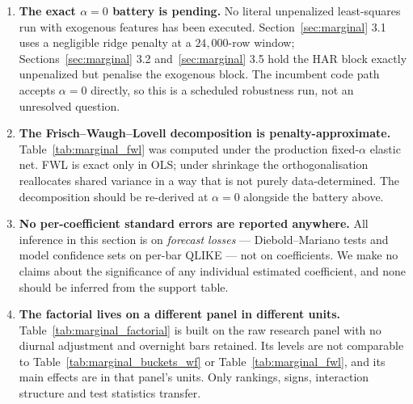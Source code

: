\begin{enumerate}
\item \textbf{The exact $\alpha = 0$ battery is pending.} No literal unpenalized
least-squares run with exogenous features has been executed. Section~\ref{sec:marginal} 3.1
uses a negligible ridge penalty at a $24{,}000$-row window; Sections~\ref{sec:marginal} 3.2
and~\ref{sec:marginal} 3.5 hold the HAR block exactly unpenalized but penalise the
exogenous block. The incumbent code path accepts $\alpha = 0$ directly, so this is a
scheduled robustness run, not an unresolved question.
\item \textbf{The Frisch--Waugh--Lovell decomposition is penalty-approximate.}
Table~\ref{tab:marginal_fwl} was computed under the production fixed-$\alpha$ elastic net.
FWL is exact only in OLS; under shrinkage the orthogonalisation reallocates shared variance
in a way that is not purely data-determined. The decomposition should be re-derived at
$\alpha = 0$ alongside the battery above.
\item \textbf{No per-coefficient standard errors are reported anywhere.} All inference in
this section is on \emph{forecast losses} --- Diebold--Mariano tests and model confidence
sets on per-bar QLIKE --- not on coefficients. We make no claims about the significance of
any individual estimated coefficient, and none should be inferred from the support table.
\item \textbf{The factorial lives on a different panel in different units.}
Table~\ref{tab:marginal_factorial} is built on the raw research panel with no diurnal
adjustment and overnight bars retained. Its levels are not comparable to
Table~\ref{tab:marginal_buckets_wf} or
Table~\ref{tab:marginal_fwl}, and its main effects are in that panel's units. Only rankings,
signs, interaction structure and test statistics transfer.
\end{enumerate}
